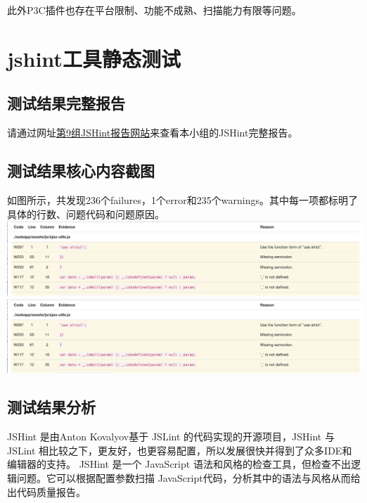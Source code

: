 \documentclass[hyperref, a4paper]{ctexart}
\begin{document}
此外P3C插件也存在平台限制、功能不成熟、扫描能力有限等问题。

\hypertarget{jshintux5de5ux5177ux9759ux6001ux6d4bux8bd5}{%
\section{jshint工具静态测试}\label{jshintux5de5ux5177ux9759ux6001ux6d4bux8bd5}}

\hypertarget{ux6d4bux8bd5ux7ed3ux679cux5b8cux6574ux62a5ux544a-2}{%
\subsection{测试结果完整报告}\label{ux6d4bux8bd5ux7ed3ux679cux5b8cux6574ux62a5ux544a-2}}

请通过网址\href{https://straybird-atsh.github.io/SoftwareQA-Testing/JSHintReport.html}{第9组JSHint报告网站}来查看本小组的JSHint完整报告。

\hypertarget{ux6d4bux8bd5ux7ed3ux679cux6838ux5fc3ux5185ux5bb9ux622aux56fe-2}{%
\subsection{测试结果核心内容截图}\label{ux6d4bux8bd5ux7ed3ux679cux6838ux5fc3ux5185ux5bb9ux622aux56fe-2}}

如图所示，共发现236个failures，1个error和235个warnings。其中每一项都标明了具体的行数、问题代码和问题原因。
\includegraphics{screenshots/pic3.jpg}
\includegraphics{screenshots/pic3.jpg}

\hypertarget{ux6d4bux8bd5ux7ed3ux679cux5206ux6790-2}{%
\subsection{测试结果分析}\label{ux6d4bux8bd5ux7ed3ux679cux5206ux6790-2}}

JSHint 是由Anton Kovalyov基于 JSLint 的代码实现的开源项目，JSHint 与
JSLint
相比较之下，更友好，也更容易配置，所以发展很快并得到了众多IDE和编辑器的支持。
JSHint 是一个 JavaScript
语法和风格的检查工具，但检查不出逻辑问题。它可以根据配置参数扫描
JavaScript代码，分析其中的语法与风格从而给出代码质量报告。
\end{document}

